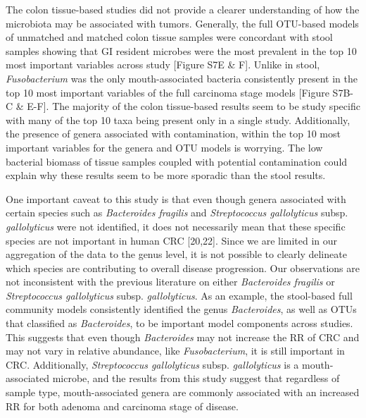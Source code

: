 \documentclass[12pt,]{article}
\begin{document}
The colon tissue-based studies did not provide a clearer understanding
of how the microbiota may be associated with tumors. Generally, the full
OTU-based models of unmatched and matched colon tissue samples were
concordant with stool samples showing that GI resident microbes were the
most prevalent in the top 10 most important variables across study
{[}Figure S7E \& F{]}. Unlike in stool, \emph{Fusobacterium} was the
only mouth-associated bacteria consistently present in the top 10 most
important variables of the full carcinoma stage models {[}Figure S7B-C
\& E-F{]}. The majority of the colon tissue-based results seem to be
study specific with many of the top 10 taxa being present only in a
single study. Additionally, the presence of genera associated with
contamination, within the top 10 most important variables for the genera
and OTU models is worrying. The low bacterial biomass of tissue samples
coupled with potential contamination could explain why these results
seem to be more sporadic than the stool results.

One important caveat to this study is that even though genera associated
with certain species such as \emph{Bacteroides fragilis} and
\emph{Streptococcus gallolyticus} subsp. \emph{gallolyticus} were not
identified, it does not necessarily mean that these specific species are
not important in human CRC {[}20,22{]}. Since we are limited in our
aggregation of the data to the genus level, it is not possible to
clearly delineate which species are contributing to overall disease
progression. Our observations are not inconsistent with the previous
literature on either \emph{Bacteroides fragilis} or \emph{Streptococcus
gallolyticus} subsp. \emph{gallolyticus}. As an example, the stool-based
full community models consistently identified the genus
\emph{Bacteroides}, as well as OTUs that classified as
\emph{Bacteroides}, to be important model components across studies.
This suggests that even though \emph{Bacteroides} may not increase the
RR of CRC and may not vary in relative abundance, like
\emph{Fusobacterium}, it is still important in CRC. Additionally,
\emph{Streptococcus gallolyticus} subsp. \emph{gallolyticus} is a
mouth-associated microbe, and the results from this study suggest that
regardless of sample type, mouth-associated genera are commonly
associated with an increased RR for both adenoma and carcinoma stage of
disease.
\end{document}
